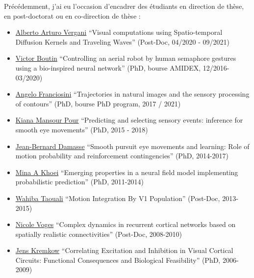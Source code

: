 \documentclass[10pt,french,a4paper,oneside]{article}%
\begin{document}
Précédemment, j'ai eu l'occasion d'encadrer des étudiants en direction de thèse, en post-doctorat ou en co-direction de thèse : %
\begin{itemize}
	\item \href{https://laurentperrinet.github.io/author/alberto-arturo-vergani/}{Alberto Arturo Vergani} 	``Visual computations using Spatio-temporal Diffusion Kernels and Traveling Waves'' (Post-Doc, 04/2020 - 09/2021)
	\item \href{https://laurentperrinet.github.io/author/victor-boutin/}{Victor Boutin} 	``Controlling an aerial robot by human semaphore gestures using a bio-inspired neural network'' (PhD, bourse AMIDEX, 12/2016-03/2020)
	\item \href{https://laurentperrinet.github.io/author/angelo-franciosini/}{Angelo Franciosini} ``Trajectories in natural images and the sensory processing of contours'' (PhD, bourse PhD program, 2017 / 2021)
	\item \href{https://laurentperrinet.github.io/author/kiana-mansour-pour/}{Kiana Mansour Pour} 	``Predicting and selecting sensory events: inference for smooth eye movements'' (PhD, 2015 - 2018)
	\item \href{https://laurentperrinet.github.io/author/jean-bernard-damasse/}{Jean-Bernard Damasse} 	``Smooth pursuit eye movements and learning: Role of motion probability and reinforcement contingencies'' (PhD, 2014-2017)
	\item \href{https://laurentperrinet.github.io/author/mina-a-khoei/}{Mina A Khoei} 	``Emerging properties in a neural field model implementing probabilistic prediction'' (PhD, 2011-2014)
	\item \href{https://laurentperrinet.github.io/author/wahiba-taouali/}{Wahiba Taouali} 	``Motion Integration By V1 Population'' (Post-Doc, 2013-2015)
	\item \href{https://laurentperrinet.github.io/author/nicole-voges/}{Nicole Voges} 	``Complex dynamics in recurrent cortical networks based on spatially realistic connectivities'' (Post-Doc, 2008-2010)
	\item \href{https://laurentperrinet.github.io/author/jens-kremkow/}{Jens Kremkow} ``Correlating Excitation and Inhibition in Visual Cortical Circuits: Functional Consequences and Biological Feasibility'' (PhD, 2006-2009)
\end{itemize}
\end{document}
